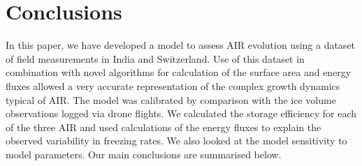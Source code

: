 \documentclass[utf8]{frontiersSCNS} %
\begin{document}
% 
% 
% 
% 
% 

\section{Conclusions} 
In this paper, we have developed a model to assess AIR evolution using a dataset of field measurements in India and
Switzerland. Use of this dataset in combination with novel algorithms for calculation of the surface area and energy
fluxes allowed a very accurate representation of the complex growth dynamics typical of AIR. The model was calibrated by
comparison with the ice volume observations logged via drone flights. We calculated the storage efficiency for each of
the three AIR and used calculations of the energy fluxes to explain the observed variability in freezing rates. We also
looked at the model sensitivity to model parameters. Our main conclusions are summarised below.
\end{document}
